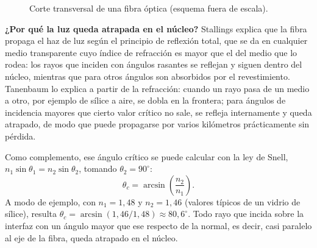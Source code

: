 \documentclass[11pt,a4paper]{article}
\begin{document}
\begin{enumerate}[label=4.\arabic*), itemsep=0.3cm]
        \begin{figure}[h]
          \centering
          \caption{Corte transversal de una fibra óptica (esquema fuera de escala).}
        \end{figure}

        \textbf{¿Por qué la luz queda atrapada en el núcleo?} Stallings explica que la fibra propaga el haz de luz según el principio de reflexión total, que se da en cualquier medio transparente cuyo índice de refracción es mayor que el del medio que lo rodea: los rayos que inciden con ángulos rasantes se reflejan y siguen dentro del núcleo, mientras que para otros ángulos son absorbidos por el revestimiento. Tanenbaum lo explica a partir de la refracción: cuando un rayo pasa de un medio a otro, por ejemplo de sílice a aire, se dobla en la frontera; para ángulos de incidencia mayores que cierto valor crítico no sale, se refleja internamente y queda atrapado, de modo que puede propagarse por varios kilómetros prácticamente sin pérdida.

        Como complemento, ese ángulo crítico se puede calcular con la ley de Snell, $n_1\sin\theta_1 = n_2\sin\theta_2$, tomando $\theta_2 = 90^\circ$:
        \[
          \theta_c = \arcsin\!\left(\frac{n_2}{n_1}\right).
        \]
        A modo de ejemplo, con $n_1 = 1{,}48$ y $n_2 = 1{,}46$ (valores típicos de un vidrio de sílice), resulta $\theta_c = \arcsin(1{,}46/1{,}48) \approx 80{,}6^\circ$. Todo rayo que incida sobre la interfaz con un ángulo mayor que ese respecto de la normal, es decir, casi paralelo al eje de la fibra, queda atrapado en el núcleo.

        \begin{figure}[h]
          \centering
\end{figure}
\end{enumerate}
\end{document}
